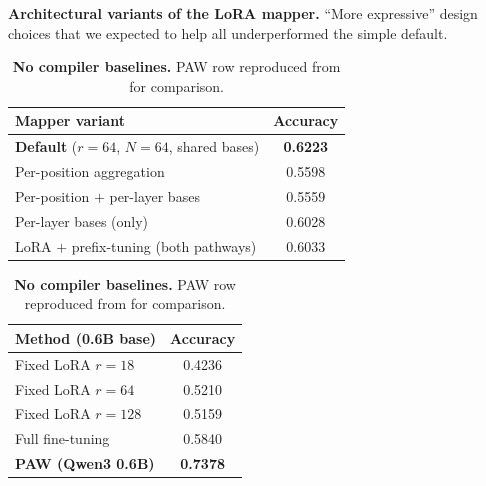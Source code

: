 \documentclass{article}
\theoremstyle{plain}
\theoremstyle{definition}
\theoremstyle{remark}
\begin{document}
\begin{table}[!t]
\centering
\begin{minipage}[t]{0.59\linewidth}
\centering
\caption{\label{tab:ablation_mapper}\textbf{Architectural variants of the LoRA mapper.} ``More expressive'' design choices that we expected to help all underperformed the simple default.}
\small
\setlength{\tabcolsep}{4pt}
\begin{tabular}{@{}lc@{}}
\toprule
Mapper variant & Accuracy \\
\midrule
\textbf{Default} ($r{=}64$, $N{=}64$, shared bases) & \textbf{0.6223} \\
Per-position aggregation                          & 0.5598 \\
Per-position $+$ per-layer bases                  & 0.5559 \\
Per-layer bases (only)                            & 0.6028 \\
LoRA $+$ prefix-tuning (both pathways)            & 0.6033 \\
\bottomrule
\end{tabular}
\end{minipage}\hfill
\begin{minipage}[t]{0.39\linewidth}
\centering
\caption{\label{tab:killer_baselines}\textbf{No compiler baselines.} PAW row reproduced from  for comparison.}
\small
\setlength{\tabcolsep}{6pt}
\begin{tabular}{@{}lc@{}}
\toprule
Method (0.6B base) & Accuracy \\
\midrule
Fixed LoRA $r{=}18$         & 0.4236  \\
Fixed LoRA $r{=}64$          & 0.5210 \\
Fixed LoRA $r{=}128$         & 0.5159 \\
Full fine-tuning          & 0.5840  \\
\textbf{PAW (Qwen3 0.6B)}             & \textbf{0.7378}  \\
\bottomrule
\end{tabular}
\end{minipage}
\end{table}




\end{document}
